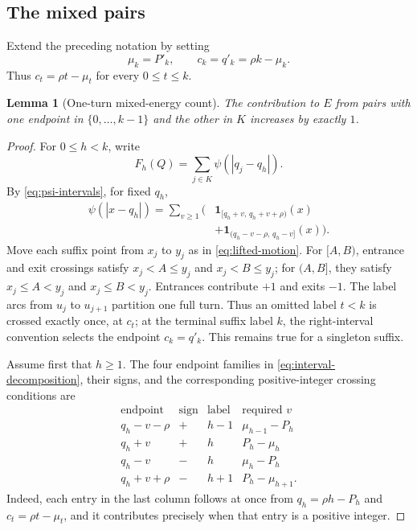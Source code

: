 \documentclass[10pt]{article}
\newtheorem{lemma}{Lemma}[section]
\newcommand{\ind}{\mathbf 1}
\begin{document}
\subsection{The mixed pairs}

Extend the preceding notation by setting
\[
  \mu_k=P'_k,
  \qquad
  c_k=q'_k=\rho k-\mu_k.
\]
Thus \(c_t=\rho t-\mu_t\) for every \(0\le t\le k\).

\begin{lemma}[One-turn mixed-energy count]
\label{lem:mixed}
The contribution to \(E\) from pairs with one endpoint in
\(\{0,\ldots,k-1\}\) and the other in \(K\) increases by exactly \(1\).
\end{lemma}

\begin{proof}
For \(0\le h<k\), write
\[
  F_h(Q)=\sum_{j\in K}\psi(|q_j-q_h|).
\]
By \eqref{eq:psi-intervals}, for fixed \(q_h\),
\begin{equation}
\begin{aligned}
\psi(|x-q_h|)=\sum_{v\ge1}\bigl(
 &\ind_{[q_h+v,\,q_h+v+\rho)}(x)\\
 &+\ind_{(q_h-v-\rho,\,q_h-v]}(x)
\bigr).
\end{aligned}
\label{eq:interval-decomposition}
\end{equation}
Move each suffix point from \(x_j\) to \(y_j\) as in
\eqref{eq:lifted-motion}.  For \([A,B)\), entrance and exit crossings satisfy
\(x_j<A\le y_j\) and \(x_j<B\le y_j\); for \((A,B]\), they satisfy
\(x_j\le A<y_j\) and \(x_j\le B<y_j\).  Entrances contribute \(+1\) and
exits \(-1\).  The label arcs from \(u_j\) to \(u_{j+1}\) partition one
full turn.  Thus an omitted label \(t<k\) is crossed exactly once, at
\(c_t\); at the terminal suffix label \(k\), the right-interval convention
selects the endpoint \(c_k=q'_k\).  This remains true for a singleton suffix.

Assume first that \(h\ge1\).  The four endpoint families in
\eqref{eq:interval-decomposition}, their signs, and the corresponding
positive-integer crossing conditions are
\[
\begin{array}{c|c|c|c}
\text{endpoint}&\text{sign}&\text{label}&\text{required }v\\ \hline
q_h-v-\rho&+&h-1&\mu_{h-1}-P_h\\
q_h+v&+&h&P_h-\mu_h\\
q_h-v&-&h&\mu_h-P_h\\
q_h+v+\rho&-&h+1&P_h-\mu_{h+1}.
\end{array}
\]
Indeed, each entry in the last column follows at once from
\(q_h=\rho h-P_h\) and \(c_t=\rho t-\mu_t\), and it contributes precisely
when that entry is a positive integer.


\end{proof}
\end{document}
